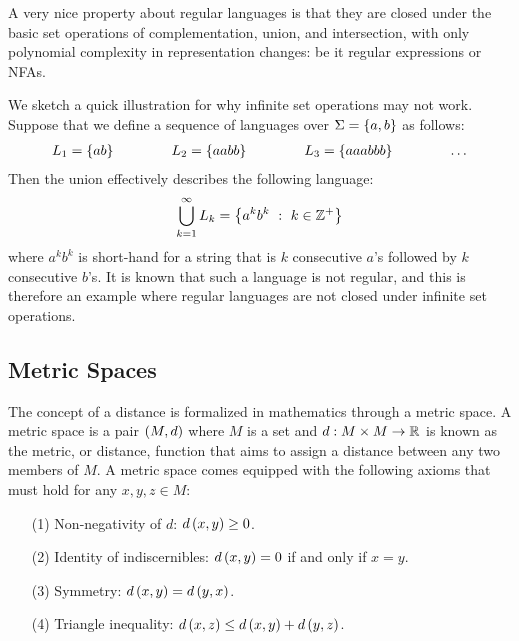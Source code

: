 A very nice property about regular languages
is that they are closed under the basic set operations of
complementation, union, and intersection,
with only polynomial complexity in representation changes:
be it regular expressions or NFAs.

We sketch a quick illustration for why infinite set operations may not work.
Suppose that we define a sequence of languages over
\(\Sigma = \left\{a, b\right\}\) as follows:
\begin{align*}
  L_1 = \left\{ab\right\}
  \qquad \qquad
  L_2 = \left\{aabb\right\}
  \qquad \qquad
  L_3 = \left\{aaabbb\right\}
  \qquad \qquad
  \ldots
\end{align*}
Then the union effectively describes the following language:
\begin{align*}
  \bigcup_{k = 1}^{\infty} L_k = \left\{a^k b^k \  : \  k \in \mathbb{Z}^{+}\right\}
\end{align*}
where \(a^k b^k\) is short-hand for a string that is
\(k\) consecutive \(a\)'s followed by \(k\) consecutive \(b\)'s.
It is known that such a language is not regular,
and this is therefore an example where regular languages
are not closed under infinite set operations.




\subsection{Metric Spaces}

The concept of a distance is formalized in mathematics through a metric space.
A metric space is a pair \(\left(M, d\right)\) where \(M\) is a set
and \(d : M \times M \to \mathbb{R}\) is known as the metric, or distance,
function that aims to assign a distance between any two members of \(M\).
A metric space comes equipped with the following axioms
that must hold for any \(x, y, z \in M\):
\begin{enumerate}
  \item[(1)]
    Non-negativity of \(d\): \(d\left(x, y\right) \geq 0\).

  \item[(2)]
    Identity of indiscernibles:
    \(d\left(x, y\right) = 0\) if and only if \(x = y\).

  \item[(3)]
    Symmetry:
    \(d\left(x, y\right) = d\left(y, x\right)\).

  \item[(4)]
    Triangle inequality:
    \(d\left(x, z\right) \leq d\left(x, y\right) + d\left(y, z\right)\).

\end{enumerate}


